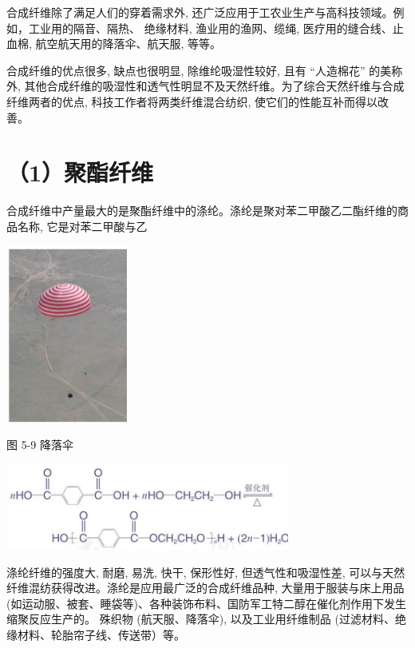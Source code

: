 \documentclass[10pt]{article}
\begin{document}
合成纤维除了满足人们的穿着需求外, 还广泛应用于工农业生产与高科技领域。例如，工业用的隔音、隔热、 绝缘材料, 渔业用的渔网、缆绳, 医疗用的缝合线、止血棉, 航空航天用的降落伞、航天服, 等等。

合成纤维的优点很多, 缺点也很明显, 除维纶吸湿性较好, 且有 “人造棉花” 的美称外, 其他合成纤维的吸湿性和透气性明显不及天然纤维。为了综合天然纤维与合成纤维两者的优点, 科技工作者将两类纤维混合纺织, 使它们的性能互补而得以改善。

\section*{（1）聚酯纤维}

合成纤维中产量最大的是聚酯纤维中的涤纶。涤纶是聚对苯二甲酸乙二酯纤维的商品名称, 它是对苯二甲酸与乙

\begin{center}
\includegraphics[max width=0.3\textwidth]{images/0190efc5-b58a-7c43-bfb0-e0a030df9cfd_147_346722.jpg}
\end{center}

图 5-9 降落伞

\begin{center}
\includegraphics[max width=0.7\textwidth]{images/0190efc5-b58a-7c43-bfb0-e0a030df9cfd_147_341600.jpg}
\end{center}

涤纶纤维的强度大, 耐磨, 易洗, 快干, 保形性好, 但透气性和吸湿性差, 可以与天然纤维混纺获得改进。涤纶是应用最广泛的合成纤维品种, 大量用于服装与床上用品 (如运动服、被套、睡袋等)、各种装饰布料、国防军工特二醇在催化剂作用下发生缩聚反应生产的。 殊织物 (航天服、降落伞), 以及工业用纤维制品 (过滤材料、绝缘材料、轮胎帘子线、传送带）等。
\end{document}
